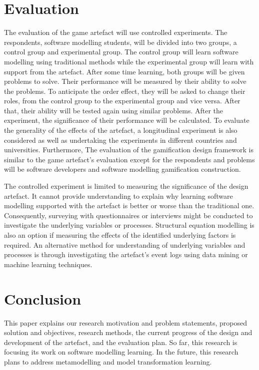 \documentclass[runningheads,a4paper]{llncs}
\begin{document}
\section{Evaluation}
The evaluation of the game artefact will use controlled experiments. The respondents, software modelling students, will be divided into two groups, a control group and experimental group. The control group will learn software modelling using traditional methods while the experimental group will learn with support from the artefact. After some time learning, both groups will be given problems to solve. Their performance will be measured by their ability to solve the problems. To anticipate the order effect, they will be asked to change their roles, from the control group to the experimental group and vice versa. After that, their ability will be tested again using similar problems. After the experiment, the significance of their performance will be calculated. To evaluate the generality of the effects of the artefact, a longitudinal experiment is also considered as well as undertaking the experiments in different countries and universities. Furthermore, The evaluation of the gamification design framework is similar to the game artefact's evaluation except for the respondents and problems will be software developers and software modelling gamification construction.

The controlled experiment is limited to measuring the significance of the design artefact. It cannot provide understanding to explain why learning software modelling supported with the artefact is better or worse than the traditional one. Consequently, surveying with questionnaires or interviews might be conducted to investigate the underlying variables or processes. Structural equation modelling \cite{hair2016primer} is also an option if measuring the effects of the identified underlying factors is required. An alternative method for understanding of underlying variables and processes is through investigating the artefact's event logs using data mining or machine learning techniques.

\section{Conclusion}
This paper explains our research motivation and problem statements, proposed solution and objectives, research methods, the current progress of the design and development of the artefact, and the evaluation plan. So far, this research is focusing its work on software modelling learning. In the future, this research plans to address metamodelling and model transformation learning. 
\end{document}
